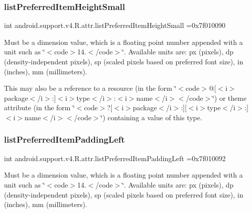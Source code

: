 \subsubsection{\texorpdfstring{list\+Preferred\+Item\+Height\+Small}{listPreferredItemHeightSmall}}
{\footnotesize\ttfamily int android.\+support.\+v4.\+R.\+attr.\+list\+Preferred\+Item\+Height\+Small =0x7f010090\hspace{0.3cm}{\ttfamily [static]}}

Must be a dimension value, which is a floating point number appended with a unit such as \char`\"{}$<$code$>$14.\+5sp$<$/code$>$\char`\"{}. Available units are\+: px (pixels), dp (density-\/independent pixels), sp (scaled pixels based on preferred font size), in (inches), mm (millimeters). 

This may also be a reference to a resource (in the form \char`\"{}$<$code$>$@\mbox{[}$<$i$>$package$<$/i$>$\+:\mbox{]}$<$i$>$type$<$/i$>$\+:$<$i$>$name$<$/i$>$$<$/code$>$\char`\"{}) or theme attribute (in the form \char`\"{}$<$code$>$?\mbox{[}$<$i$>$package$<$/i$>$\+:\mbox{]}\mbox{[}$<$i$>$type$<$/i$>$\+:\mbox{]}$<$i$>$name$<$/i$>$$<$/code$>$\char`\"{}) containing a value of this type. \mbox{\label{classandroid_1_1support_1_1v4_1_1R_1_1attr_a9a8582bc6e567f1987e92f27316b6abf}} 
\subsubsection{\texorpdfstring{list\+Preferred\+Item\+Padding\+Left}{listPreferredItemPaddingLeft}}
{\footnotesize\ttfamily int android.\+support.\+v4.\+R.\+attr.\+list\+Preferred\+Item\+Padding\+Left =0x7f010092\hspace{0.3cm}{\ttfamily [static]}}

Must be a dimension value, which is a floating point number appended with a unit such as \char`\"{}$<$code$>$14.\+5sp$<$/code$>$\char`\"{}. Available units are\+: px (pixels), dp (density-\/independent pixels), sp (scaled pixels based on preferred font size), in (inches), mm (millimeters). 

